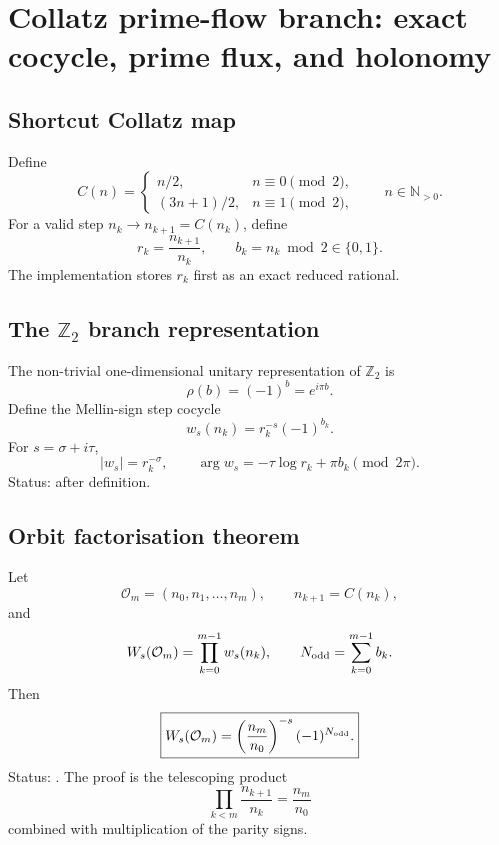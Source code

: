 \section{Collatz prime-flow branch: exact cocycle, prime flux, and holonomy}

\subsection{Shortcut Collatz map}

Define
\begin{equation}
C(n)=
\begin{cases}
n/2,&n\equiv0\pmod2,\\[2mm]
(3n+1)/2,&n\equiv1\pmod2,
\end{cases}
\qquad n\in\mathbb N_{>0}.
\end{equation}
For a valid step \(n_k\to n_{k+1}=C(n_k)\), define
\begin{equation}
r_k=\frac{n_{k+1}}{n_k},
\qquad
b_k=n_k\bmod2\in\{0,1\}.
\end{equation}
The implementation stores \(r_k\) first as an exact reduced rational.

\subsection{The \(\mathbb Z_2\) branch representation}

The non-trivial one-dimensional unitary representation of \(\mathbb Z_2\) is
\begin{equation}
\boxed{\rho(b)=(-1)^b=e^{i\pi b}.}
\end{equation}
Define the Mellin-sign step cocycle
\begin{equation}
\boxed{w_s(n_k)=r_k^{-s}(-1)^{b_k}.}
\label{eq:step-cocycle}
\end{equation}
For \(s=\sigma+i\tau\),
\begin{equation}
|w_s|=r_k^{-\sigma},
\qquad
\arg w_s=-\tau\log r_k+\pi b_k\pmod{2\pi}.
\end{equation}
Status:  after definition.

\subsection{Orbit factorisation theorem}

Let
\begin{equation}
\mathcal O_m=(n_0,n_1,\ldots,n_m),
\qquad n_{k+1}=C(n_k),
\end{equation}
and
\begin{equation}
W_s(\mathcal O_m)=\prod_{k=0}^{m-1}w_s(n_k),
\qquad
N_{\rm odd}=\sum_{k=0}^{m-1}b_k.
\end{equation}
Then
\begin{equation}
\boxed{
W_s(\mathcal O_m)
=
\left(\frac{n_m}{n_0}\right)^{-s}
(-1)^{N_{\rm odd}}.
}
\label{eq:orbit-factor}
\end{equation}
Status: . The proof is the telescoping product
\begin{equation}
\prod_{k<m}\frac{n_{k+1}}{n_k}=\frac{n_m}{n_0}
\end{equation}
combined with multiplication of the parity signs.


